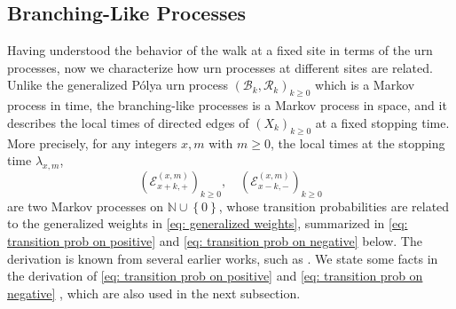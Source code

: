 \documentclass[EJP]{ejpecp} %
\begin{document}
\subsection{Branching-Like Processes}
Having understood the behavior of the walk at a fixed site in terms of the urn processes, now we characterize how urn processes at different sites are related. Unlike the generalized P\'{o}lya urn process $(\mathscr{B}_k,\mathscr{R}_k )_{k \ge 0}$ which is a Markov process in time, the branching-like processes is a Markov process in space, and it describes the local times of directed edges of $(X_k)_{k\geq 0}$ at a fixed stopping time.
More precisely, for any integers $x,m$ with $m\geq 0$, the local times at the stopping time $\lambda_{x,m}$, 
\[
\left(\mathcal{E}^{(x,m)}_{x+k,+} \right)_{k\geq 0}, \quad \left(\mathcal{E}^{(x,m)}_{x-k,-} \right)_{k\geq 0}
\]
are two Markov processes on $\mathbb{N}\cup\left\{0\right\}$, whose transition probabilities are related to the generalized weights in \eqref{eq: generalized weights}, summarized in \eqref{eq: transition prob on positive} and \eqref{eq: transition prob on negative} below. The derivation is known from several earlier works, such as \cite{T96, KP16}. We state some facts in the derivation of \eqref{eq: transition prob on positive} and \eqref{eq: transition prob on negative} , which are also used in the next subsection.
\end{document}

